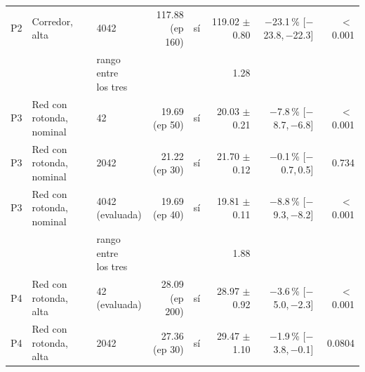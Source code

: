 \begin{table}[H]
\begin{tabular}{lllrlrrr}
P2 & \makecell[l]{Corredor,\\{}alta} & 4042 & \makecell[r]{117.88\\{}(ep 160)} & sí & \makecell[r]{119.02\\{}$\pm$ 0.80} & \makecell[r]{$-$23.1\,\%\\{}[$-$23.8,\,$-$22.3]} & $<$\,0.001 \\
 & & \makecell[l]{rango entre\\{}los tres} & & & 1.28 & & \\
P3 & \makecell[l]{Red con rotonda,\\{}nominal} & 42 & \makecell[r]{19.69\\{}(ep 50)} & sí & \makecell[r]{20.03\\{}$\pm$ 0.21} & \makecell[r]{$-$7.8\,\%\\{}[$-$8.7,\,$-$6.8]} & $<$\,0.001 \\
P3 & \makecell[l]{Red con rotonda,\\{}nominal} & 2042 & \makecell[r]{21.22\\{}(ep 30)} & sí & \makecell[r]{21.70\\{}$\pm$ 0.12} & \makecell[r]{$-$0.1\,\%\\{}[$-$0.7,\,0.5]} & 0.734 \\
P3 & \makecell[l]{Red con rotonda,\\{}nominal} & \makecell[l]{4042\\{}(evaluada)} & \makecell[r]{19.69\\{}(ep 40)} & sí & \makecell[r]{19.81\\{}$\pm$ 0.11} & \makecell[r]{$-$8.8\,\%\\{}[$-$9.3,\,$-$8.2]} & $<$\,0.001 \\
 & & \makecell[l]{rango entre\\{}los tres} & & & 1.88 & & \\
P4 & \makecell[l]{Red con rotonda,\\{}alta} & \makecell[l]{42\\{}(evaluada)} & \makecell[r]{28.09\\{}(ep 200)} & sí & \makecell[r]{28.97\\{}$\pm$ 0.92} & \makecell[r]{$-$3.6\,\%\\{}[$-$5.0,\,$-$2.3]} & $<$\,0.001 \\
P4 & \makecell[l]{Red con rotonda,\\{}alta} & 2042 & \makecell[r]{27.36\\{}(ep 30)} & sí & \makecell[r]{29.47\\{}$\pm$ 1.10} & \makecell[r]{$-$1.9\,\%\\{}[$-$3.8,\,$-$0.1]} & 0.0804 \\

\end{tabular}
\end{table}
